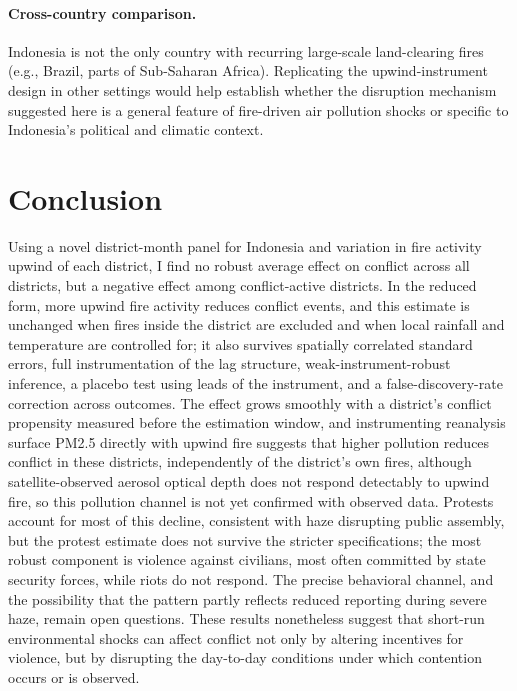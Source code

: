 \documentclass[12pt]{article}
\begin{document}
\paragraph{Cross-country comparison.} Indonesia is not the only country with recurring large-scale land-clearing fires (e.g., Brazil, parts of Sub-Saharan Africa). Replicating the upwind-instrument design in other settings would help establish whether the disruption mechanism suggested here is a general feature of fire-driven air pollution shocks or specific to Indonesia's political and climatic context.

\section{Conclusion}
\label{sec:conclusion}

Using a novel district-month panel for Indonesia and variation in fire activity upwind of each district, I find no robust average effect on conflict across all districts, but a negative effect among conflict-active districts. In the reduced form, more upwind fire activity reduces conflict events, and this estimate is unchanged when fires inside the district are excluded and when local rainfall and temperature are controlled for; it also survives spatially correlated standard errors, full instrumentation of the lag structure, weak-instrument-robust inference, a placebo test using leads of the instrument, and a false-discovery-rate correction across outcomes. The effect grows smoothly with a district's conflict propensity measured before the estimation window, and instrumenting reanalysis surface PM2.5 directly with upwind fire suggests that higher pollution reduces conflict in these districts, independently of the district's own fires, although satellite-observed aerosol optical depth does not respond detectably to upwind fire, so this pollution channel is not yet confirmed with observed data. Protests account for most of this decline, consistent with haze disrupting public assembly, but the protest estimate does not survive the stricter specifications; the most robust component is violence against civilians, most often committed by state security forces, while riots do not respond. The precise behavioral channel, and the possibility that the pattern partly reflects reduced reporting during severe haze, remain open questions. These results nonetheless suggest that short-run environmental shocks can affect conflict not only by altering incentives for violence, but by disrupting the day-to-day conditions under which contention occurs or is observed.
\end{document}
